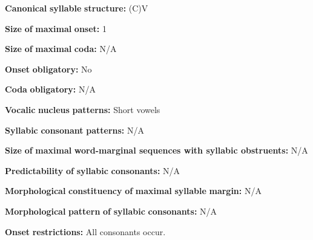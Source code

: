 \documentclass[output=paper]{langsci/langscibook}
\begin{document}
\begin{styleBody}
\textbf{Canonical} \textbf{syllable} \textbf{structure:} (C)V \citep[11-12]{Franklin1971}
\end{styleBody}

\begin{styleBody}
\textbf{Size} \textbf{of} \textbf{maximal} \textbf{onset:} 1
\end{styleBody}

\begin{styleBody}
\textbf{Size} \textbf{of} \textbf{maximal} \textbf{coda:} N/A
\end{styleBody}

\begin{styleBody}
\textbf{Onset} \textbf{obligatory:} No
\end{styleBody}

\begin{styleBody}
\textbf{Coda} \textbf{obligatory:} N/A
\end{styleBody}

\begin{styleBody}
\textbf{Vocalic} \textbf{nucleus} \textbf{patterns:} Short vowels
\end{styleBody}

\begin{styleBody}
\textbf{Syllabic} \textbf{consonant} \textbf{patterns:} N/A
\end{styleBody}

\begin{styleBody}
\textbf{Size} \textbf{of} \textbf{maximal} \textbf{word{}-marginal sequences with syllabic obstruents:} N/A
\end{styleBody}

\begin{styleBody}
\textbf{Predictability} \textbf{of} \textbf{syllabic} \textbf{consonants:} N/A
\end{styleBody}

\begin{styleBody}
\textbf{Morphological} \textbf{constituency} \textbf{of} \textbf{maximal} \textbf{syllable} \textbf{margin:} N/A
\end{styleBody}

\begin{styleBody}
\textbf{Morphological} \textbf{pattern} \textbf{of} \textbf{syllabic} \textbf{consonants:} N/A
\end{styleBody}

\begin{styleBody}
\textbf{Onset} \textbf{restrictions:} All consonants occur.
\end{styleBody}
\end{document}
